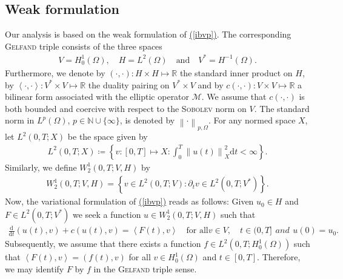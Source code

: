 \documentclass[11pt, a4paper]{article}
\renewcommand{\eqref}[1]{\hyperref[#1]{(\ref{#1})}}  %
\newcommand{\pt}{\partial}
\newcommand{\scal}[2]{\left(#1,#2\right)}
\newcommand{\dual}[2]{\left\langle#1,#2\right\rangle}
\newcommand{\mM}{\mathcal{M}}
\newcommand{\NN}{\mathbb{N}}
\newcommand{\D}{\mathrm{d}}
\newcommand{\norm}[1]{\left\|#1\right\|}
\begin{document}
	\subsection{Weak formulation}
	Our analysis is based on the weak formulation of \eqref{ibvp}. The corresponding \textsc{Gelfand} triple consists of the three spaces
	\begin{gather}\label{eq:gelfand}
		V = H^1_0(\Omega),  \quad H = L^2(\Omega) \quad \text{and} \quad V^* = H^{-1}(\Omega). 
	\end{gather}
	Furthermore, we denote by \mbox{$\scal{\cdot}{\cdot}: H \times H \mapsto \mathbb{R}$} the standard inner product on $H$, by \mbox{$\dual{\cdot}{\cdot}: V^* \times V \mapsto \mathbb{R}$} the duality pairing on \mbox{$V^* \times V$} and by \mbox{$c(\cdot, \cdot): V \times V \mapsto \mathbb{R}$} a bilinear form associated with the elliptic operator $\mM$. We assume that \(c\scal{\cdot}{\cdot}\) is both bounded and coercive with respect to the \textsc{Sobolev} norm on \(V\). The standard norm in $L^p(\Omega)$, \mbox{$p\in \NN \cup \{\infty\}$}, is denoted by $\norm{\cdot}_{p,\Omega}$. For any normed space $X$, let $L^2(0,T;X)$ be the space given by
	\begin{gather*}
		L^2(0,T;X) \coloneqq \left\{v:[0,T] \mapsto X: \int_{0}^{T} \norm{u(t)}^2_X \D t < \infty\right\}.
	\end{gather*}
	Similarly, we define $W^1_2(0,T;V,H)$ by 
	\begin{gather*}
		W^1_2(0,T;V,H) = \left\{ v \in L^2(0,T;V) : \pt_t v \in L^2(0,T;V^*)\right\}.
	\end{gather*}
	Now, the variational formulation of \eqref{ibvp} reads as follows: Given $u_0 \in H$ and $F\in L^2(0,T;V^*)$ we seek a function $u\in W^1_2(0,T;V,H)$ such that
	\begin{subequations}\label{eq:var-form}
		\begin{gather}
			\frac{\D }{\D t}\scal{u(t)}{v} + c\scal{u(t)}{v} = \dual{F(t)}{v} \quad \text{for all} v\in V, \quad t\in(0,T]
		\end{gather}
		and 
		\begin{gather}
			u(0) = u_0.
		\end{gather}
	\end{subequations}
	Subsequently, we assume that there exists a function \mbox{$f\in L^2\left(0,T; H^1_0(\Omega)\right)$} such that \mbox{$\dual{F(t)}{v} = \scal{f(t)}{v}$} for all \mbox{$v \in H^1_0(\Omega)$} and \mbox{$t\in [0,T]$}. Therefore, we may identify \(F\) by \(f\) in the \textsc{Gelfand} triple sense.
	
\end{document}
